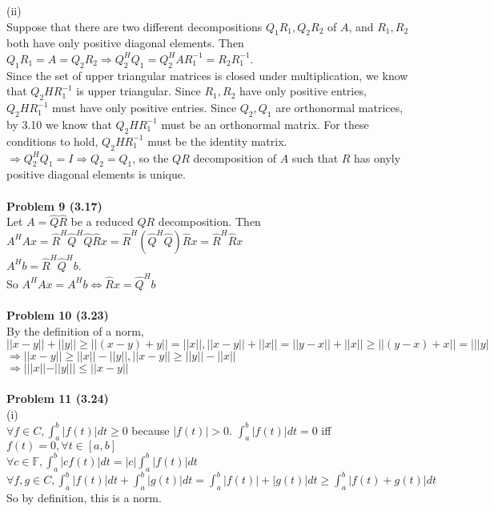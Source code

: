 \documentclass[letterpaper,12pt]{article}
\theoremstyle{definition}
\begin{document}
(ii)\\
Suppose that there are two different decompositions $Q_1R_1, Q_2R_2$ of $A$, and $R_1, R_2$ both have only positive diagonal elements. Then $Q_1R_1 = A = Q_2R_2\Rightarrow Q_2^HQ_1 = Q_2^H AR_1^{-1} = R_2R_1^{-1}$.\\
Since the set of upper triangular matrices is closed under multiplication, we know that $Q_2 H R_1^{-1}$ is upper triangular. Since $R_1, R_2$ have only positive entries, $Q_2 H R_1^{-1}$ must have only positive entries. Since $Q_2, Q_1$ are orthonormal matrices, by 3.10 we know that $Q_2 H R_1^{-1}$ must be an orthonormal matrix. For these conditions to hold, $Q_2 H R_1^{-1}$ must be the identity matrix. $\Rightarrow Q_2^HQ_1 = I\Rightarrow Q_2 = Q_1$, so the $QR$ decomposition of $A$ such that $R$ has onyly positive diagonal elements is unique.\\
\\
\noindent\textbf{Problem 9 (3.17)}\\
Let $A=\hat{Q}\hat{R}$ be a reduced $QR$ decomposition. Then \\$A^HAx = \hat{R}^H\hat{Q}^H\hat{Q}\hat{R}x = \hat{R}^H(\hat{Q}^H\hat{Q})\hat{R}x = \hat{R}^H\hat{R}x$\\
$A^H b = \hat{R}^H\hat{Q}^H b$.\\
So $A^HAx = A^H b \Leftrightarrow \hat{R}x = \hat{Q}^H b$\\
\\
\noindent\textbf{Problem 10 (3.23)}\\
By the definition of a norm, $||x-y||+||y||\geq ||(x-y)+y||=||x||, ||x-y||+||x||=||y-x||+||x||\geq ||(y-x)+x||=|||y|$\\
$\Rightarrow ||x-y||\geq ||x||-||y||, ||x-y||\geq ||y||-||x||$\\
$\Rightarrow |||x||-||y|||\leq ||x-y||$\\
\\
\noindent\textbf{Problem 11 (3.24)}\\
(i)\\
$\forall f\in C, \int_a^b|f(t)|dt \geq 0$ because $|f(t)|>0$. $\int_a^b|f(t)|dt=0$ iff $f(t)=0, \forall t\in [a,b]$\\
$\forall c\in \mathbb{F}, \int_a^b |cf(t)|dt = |c|\int_a^b |f(t)|dt$\\
$\forall f, g\in C, \int_a^b |f(t)|dt+\int_a^b|g(t)|dt=\int_a^b |f(t)|+|g(t)|dt\geq \int_a^b|f(t)+g(t)|dt$\\
So by definition, this is a norm.\\
\\
\end{document}
